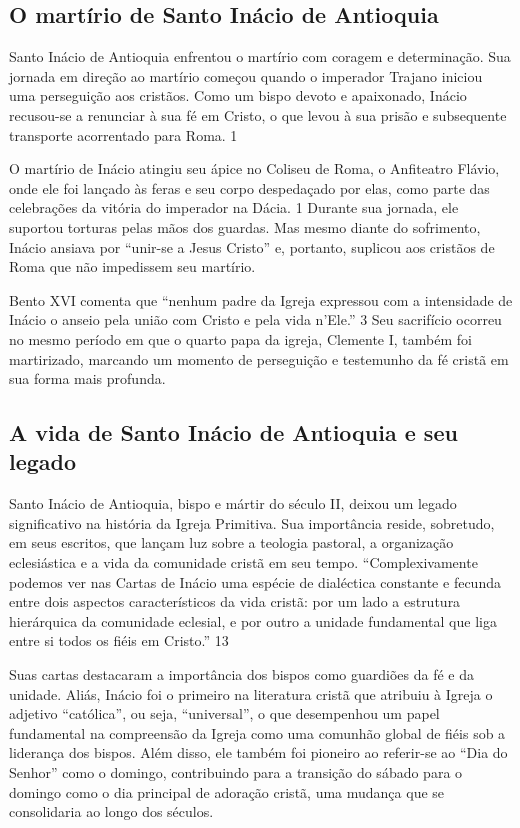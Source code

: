 \documentclass[a4paper,14pt]{extarticle} \usepackage[utf8]{inputenc}
\begin{document}
\subsection{O martírio de Santo Inácio de Antioquia}

Santo Inácio de Antioquia enfrentou o martírio com coragem e determinação. Sua jornada em direção ao martírio começou quando o imperador Trajano iniciou uma perseguição aos cristãos. Como um bispo devoto e apaixonado, Inácio recusou-se a renunciar à sua fé em Cristo, o que levou à sua prisão e subsequente transporte acorrentado para Roma. 1

O martírio de Inácio atingiu seu ápice no Coliseu de Roma, o Anfiteatro Flávio, onde ele foi lançado às feras e seu corpo despedaçado por elas, como parte das celebrações da vitória do imperador na Dácia. 1 Durante sua jornada, ele suportou torturas pelas mãos dos guardas. Mas mesmo diante do sofrimento, Inácio ansiava por “unir-se a Jesus Cristo” e, portanto, suplicou aos cristãos de Roma que não impedissem seu martírio.

Bento XVI comenta que “nenhum padre da Igreja expressou com a intensidade de Inácio o anseio pela união com Cristo e pela vida n’Ele.” 3 Seu sacrifício ocorreu no mesmo período em que o quarto papa da igreja, Clemente I, também foi martirizado, marcando um momento de perseguição e testemunho da fé cristã em sua forma mais profunda.
\subsection{A vida de Santo Inácio de Antioquia e seu legado}

Santo Inácio de Antioquia, bispo e mártir do século II, deixou um legado significativo na história da Igreja Primitiva. Sua importância reside, sobretudo, em seus escritos, que lançam luz sobre a teologia pastoral, a organização eclesiástica e a vida da comunidade cristã em seu tempo. “Complexivamente podemos ver nas Cartas de Inácio uma espécie de dialéctica constante e fecunda entre dois aspectos característicos da vida cristã: por um lado a estrutura hierárquica da comunidade eclesial, e por outro a unidade fundamental que liga entre si todos os fiéis em Cristo.” 13

Suas cartas destacaram a importância dos bispos como guardiões da fé e da unidade. Aliás, Inácio foi o primeiro na literatura cristã que atribuiu à Igreja o adjetivo “católica”, ou seja, “universal”, o que desempenhou um papel fundamental na compreensão da Igreja como uma comunhão global de fiéis sob a liderança dos bispos. Além disso, ele também foi pioneiro ao referir-se ao “Dia do Senhor” como o domingo, contribuindo para a transição do sábado para o domingo como o dia principal de adoração cristã, uma mudança que se consolidaria ao longo dos séculos.
\end{document}
